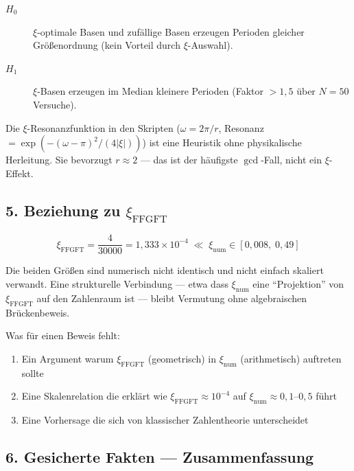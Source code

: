 \begin{description}
\item[$H_0$] $\xi$-optimale Basen und zufällige Basen erzeugen Perioden gleicher
Größenordnung (kein Vorteil durch $\xi$-Auswahl).
\item[$H_1$] $\xi$-Basen erzeugen im Median kleinere Perioden (Faktor $> 1{,}5$
über $N = 50$ Versuche).
\end{description}

\begin{mdframed}[style=warn]
Die $\xi$-Resonanzfunktion in den Skripten
($\omega = 2\pi/r$, Resonanz $= \exp(-(\omega - \pi)^2 / (4|\xi|))$)
ist eine Heuristik ohne physikalische Herleitung. Sie bevorzugt $r \approx 2$
— das ist der häufigste $\gcd$-Fall, nicht ein $\xi$-Effekt.
\end{mdframed}

\subsection*{5. Beziehung zu $\xi_\text{FFGFT}$}

\[
\xi_\text{FFGFT} = \frac{4}{30000} = 1{,}333 \times 10^{-4}
\;\ll\; \xi_\text{num} \in [0{,}008,\; 0{,}49]
\]

Die beiden Größen sind numerisch nicht identisch und nicht einfach skaliert
verwandt. Eine strukturelle Verbindung — etwa dass $\xi_\text{num}$ eine
``Projektion'' von $\xi_\text{FFGFT}$ auf den Zahlenraum ist — bleibt Vermutung
ohne algebraischen Brückenbeweis.

Was für einen Beweis fehlt:
\begin{enumerate}
\item Ein Argument warum $\xi_\text{FFGFT}$ (geometrisch) in $\xi_\text{num}$
(arithmetisch) auftreten sollte
\item Eine Skalenrelation die erklärt wie $\xi_\text{FFGFT} \approx 10^{-4}$
auf $\xi_\text{num} \approx 0{,}1\text{--}0{,}5$ führt
\item Eine Vorhersage die sich von klassischer Zahlentheorie unterscheidet
\end{enumerate}

\subsection*{6. Gesicherte Fakten — Zusammenfassung}


